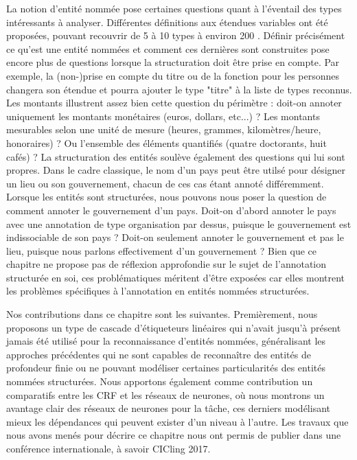 \documentclass[PhD-Yoann-Dupont.tex]{subfiles}
\begin{document}
La notion d'entité nommée pose certaines questions quant à l'éventail des types intéressants à analyser. Différentes définitions aux étendues variables ont été proposées, pouvant recouvrir de 5 à 10 types \citep{grishman1996message,tjong2003introduction,sagot2012annotation} à environ 200 \citep{sekine2002extended}. Définir précisément ce qu'est une entité nommées et comment ces dernières sont construites pose encore plus de questions lorsque la structuration doit être prise en compte. Par exemple, la (non-)prise en compte du titre ou de la fonction pour les personnes changera son étendue et pourra ajouter le type "titre" à la liste de types reconnus. Les montants illustrent assez bien cette question du périmètre : doit-on annoter uniquement les montants monétaires (euros, dollars, etc...) ? Les montants mesurables selon une unité de mesure (heures, grammes, kilomètres/heure, honoraires) ? Ou l'ensemble des éléments quantifiés (quatre doctorants, huit cafés) ? La structuration des entités soulève également des questions qui lui sont propres. Dans le cadre classique, le nom d'un pays peut être utilsé pour désigner un lieu ou son gouvernement, chacun de ces cas étant annoté différemment. Lorsque les entités sont structurées, nous pouvons nous poser la question de comment annoter le gouvernement d'un pays. Doit-on d'abord annoter le pays avec une annotation de type organisation par dessus, puisque le gouvernement est indissociable de son pays ? Doit-on seulement annoter le gouvernement et pas le lieu, puisque nous parlons effectivement d'un gouvernement ? Bien que ce chapitre ne propose pas de réflexion approfondie sur le sujet de l'annotation structurée en soi, ces problématiques méritent d'être exposées car elles montrent les problèmes spécifiques à l'annotation en entités nommées structurées.

Nos contributions dans ce chapitre sont les suivantes. Premièrement, nous proposons un type de cascade d'étiqueteurs linéaires qui n'avait jusqu'à présent jamais été utilisé pour la reconnaissance d'entités nommées, généralisant les approches précédentes qui ne sont capables de reconnaître des entités de profondeur finie ou ne pouvant modéliser certaines particularités des entités nommées structurées. Nous apportons également comme contribution un comparatifs entre les CRF et les réseaux de neurones, où nous montrons un avantage clair des réseaux de neurones pour la tâche, ces derniers modélisant mieux les dépendances qui peuvent exister d'un niveau à l'autre. Les travaux que nous avons menés pour décrire ce chapitre nous ont permis de publier dans une conférence internationale, à savoir CICling 2017.
\end{document}
